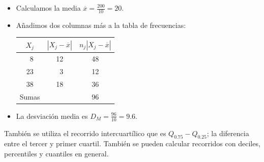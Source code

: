 \begin{frame}
\begin{itemize}
\item Calculamos la media $\overline{x}=\frac{200}{10}=20$.
\item Añadimos dos columnas más a la tabla de frecuencias:
\begin{center}
\begin{tabular}{ccc}
$X_j$  & $|X_j-\overline{x}|$ &  $n_j|X_j-\overline{x}|$ \\ \hline \ 8     & 12   &   48
\\ 23     & \ 3     &  12  \\ 38     & 18     &  36   \\ \hline Sumas  &       &  96 \\
\end{tabular}
\end{center}
\item  La desviación media es $D_M=\frac{96}{10}=9.6$.
\end{itemize}
\end{frame}

\begin{frame}
También se utiliza el recorrido intercuartílico que es $Q_{0.75}-Q_{0.25}$; la diferencia entre el
tercer y primer cuartil. También se pueden calcular recorridos con deciles, percentiles y
cuantiles en general.
\end{frame}

